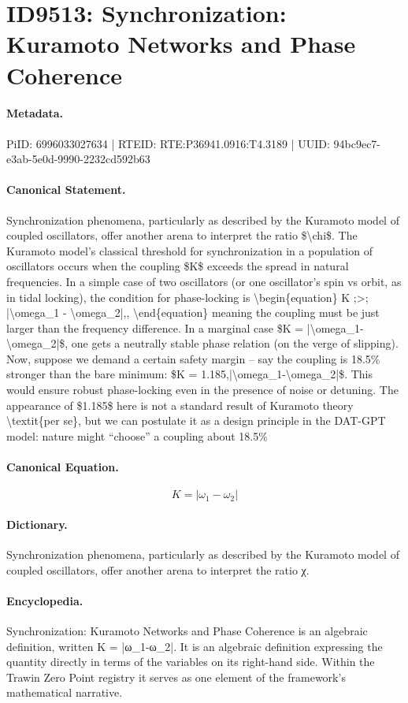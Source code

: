 \section*{ID9513: Synchronization: Kuramoto Networks and Phase Coherence}
\paragraph{Metadata.}
PiID: 6996033027634 | RTEID: RTE:P36941.0916:T4.3189 | UUID: 94bc9ec7-e3ab-5e0d-9990-2232cd592b63

\paragraph{Canonical Statement.}
Synchronization phenomena, particularly as described by the Kuramoto model of coupled oscillators, offer another arena to interpret the ratio \$\textbackslash{}chi\$. The Kuramoto model’s classical threshold for synchronization in a population of oscillators occurs when the coupling \$K\$ exceeds the spread in natural frequencies. In a simple case of two oscillators (or one oscillator’s spin vs orbit, as in tidal locking), the condition for phase-locking is \textbackslash{}begin\{equation\} K ;>; |\textbackslash{}omega\_1 - \textbackslash{}omega\_2|,, \textbackslash{}end\{equation\} meaning the coupling must be just larger than the frequency difference. In a marginal case \$K = |\textbackslash{}omega\_1-\textbackslash{}omega\_2|\$, one gets a neutrally stable phase relation (on the verge of slipping). Now, suppose we demand a certain safety margin – say the coupling is 18.5\% stronger than the bare minimum: \$K = 1.185,|\textbackslash{}omega\_1-\textbackslash{}omega\_2|\$. This would ensure robust phase-locking even in the presence of noise or detuning. The appearance of \$1.185\$ here is not a standard result of Kuramoto theory \textbackslash{}textit\{per se\}, but we can postulate it as a design principle in the DAT-GPT model: nature might “choose” a coupling about 18.5\%

\paragraph{Canonical Equation.}
\[
K = |\omega_1-\omega_2|
\]

\paragraph{Dictionary.}
Synchronization phenomena, particularly as described by the Kuramoto model of coupled oscillators, offer another arena to interpret the ratio χ.

\paragraph{Encyclopedia.}
Synchronization: Kuramoto Networks and Phase Coherence is an algebraic definition, written K = |ω\_1-ω\_2|. It is an algebraic definition expressing the quantity directly in terms of the variables on its right-hand side. Within the Trawin Zero Point registry it serves as one element of the framework's mathematical narrative.

